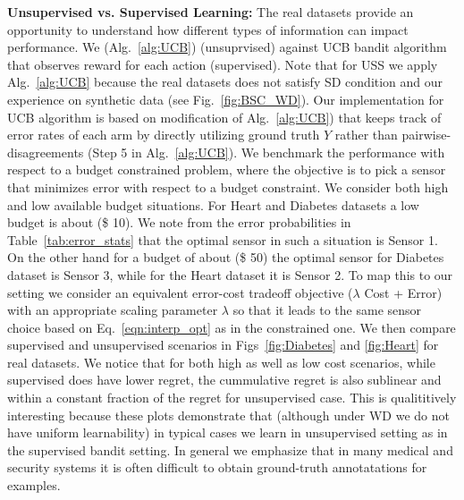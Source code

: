 \noindent
{\bf Unsupervised vs. Supervised Learning:}
The real datasets provide an opportunity to understand how different types of information can impact performance. We  (Alg.~\ref{alg:UCB}) (unsuprvised) against UCB bandit algorithm that observes reward for each action (supervised). Note that for USS we apply Alg.~\ref{alg:UCB} because the real datasets does not satisfy SD condition and our experience on synthetic data (see Fig.~\ref{fig:BSC_WD}). Our implementation for UCB algorithm is based on modification of Alg.~\ref{alg:UCB}) that keeps track of error rates of each arm by  directly utilizing ground truth $Y$ rather than pairwise-disagreements (Step 5 in Alg.~\ref{alg:UCB}). We benchmark the performance with respect to a budget constrained problem, where the objective is to pick a sensor that minimizes error with respect to a budget constraint. We consider both high and low available budget situations. For Heart and Diabetes datasets a low budget is about (\$ 10). We note from the error probabilities in Table~\ref{tab:error_stats} that the optimal sensor in such a situation is Sensor 1. On the other hand for a budget of about (\$ 50) the optimal sensor for Diabetes dataset is Sensor 3, while for the Heart dataset it is Sensor 2. To map this to our setting we consider an equivalent error-cost tradeoff objective ($\lambda$ Cost + Error) with an appropriate scaling parameter $\lambda$ so that it leads to the same sensor choice based on Eq.~\ref{eqn:interp_opt} as in the constrained one. We then compare supervised and unsupervised scenarios in Figs~\ref{fig:Diabetes} and \ref{fig:Heart} for real datasets. We notice that for both high as well as low cost scenarios, while supervised does have lower regret, the cummulative regret is also sublinear and within a constant fraction of the regret for unsupervised case. This is qualititively interesting because these plots demonstrate that (although under WD we do not have uniform learnability) in typical cases we learn in unsupervised setting as in the supervised bandit setting. In general we emphasize that in many medical and security systems it is often difficult to obtain ground-truth annotatations for examples.



